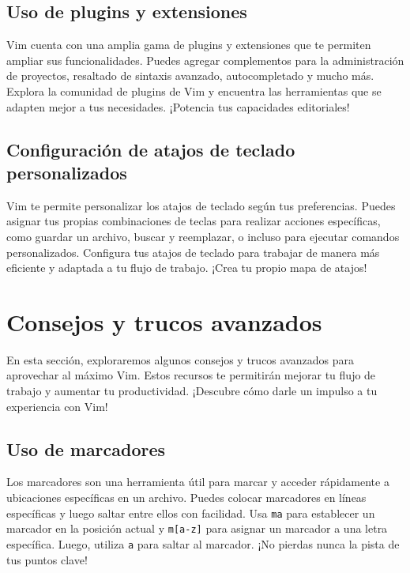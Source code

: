 \documentclass[
  doc,
  floatsintext,
  longtable,
  a4paper,
  nolmodern,
  notxfonts,
  notimes,
  colorlinks=true,linkcolor=blue,citecolor=blue,urlcolor=blue]{apa7}
\begin{document}
\subsection{Uso de plugins y
extensiones}\label{uso-de-plugins-y-extensiones}

Vim cuenta con una amplia gama de plugins y extensiones que te permiten
ampliar sus funcionalidades. Puedes agregar complementos para la
administración de proyectos, resaltado de sintaxis avanzado,
autocompletado y mucho más. Explora la comunidad de plugins de Vim y
encuentra las herramientas que se adapten mejor a tus necesidades.
¡Potencia tus capacidades editoriales!

\subsection{Configuración de atajos de teclado
personalizados}\label{configuraciuxf3n-de-atajos-de-teclado-personalizados}

Vim te permite personalizar los atajos de teclado según tus
preferencias. Puedes asignar tus propias combinaciones de teclas para
realizar acciones específicas, como guardar un archivo, buscar y
reemplazar, o incluso para ejecutar comandos personalizados. Configura
tus atajos de teclado para trabajar de manera más eficiente y adaptada a
tu flujo de trabajo. ¡Crea tu propio mapa de atajos!

\section{Consejos y trucos avanzados}\label{consejos-y-trucos-avanzados}

En esta sección, exploraremos algunos consejos y trucos avanzados para
aprovechar al máximo Vim. Estos recursos te permitirán mejorar tu flujo
de trabajo y aumentar tu productividad. ¡Descubre cómo darle un impulso
a tu experiencia con Vim!

\subsection{Uso de marcadores}\label{uso-de-marcadores}

Los marcadores son una herramienta útil para marcar y acceder
rápidamente a ubicaciones específicas en un archivo. Puedes colocar
marcadores en líneas específicas y luego saltar entre ellos con
facilidad. Usa \texttt{ma} para establecer un marcador en la posición
actual y \texttt{m{[}a-z{]}} para asignar un marcador a una letra
específica. Luego, utiliza \texttt{\textquotesingle{}a} para saltar al
marcador. ¡No pierdas nunca la pista de tus puntos clave!
\end{document}
